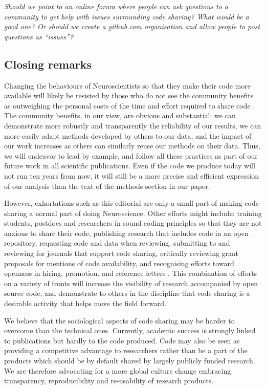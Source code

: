 \documentclass[11pt]{article}
\begin{document}
\textit{Should we point to an online forum where people can ask
  questions to a community to get help with issues surrounding code
  sharing?  What would be a good one?  Or should we create a
  github.com organisation and allow people to post questions as
  ``issues''?}


\subsection*{Closing remarks}

Changing the behaviours of Neuroscientists so that they make their code more available 
will likely be resisted by those who do not see the community benefits as outweighing 
the personal costs of the time and effort required to share code \cite{stodden2010scientific}. 
The community benefits, in our view, are obvious and substantial: we can demonstrate 
more robustly and transparently the reliability of our results, we can more easily adapt
 methods developed by others to our data, and the impact of our work increases as others 
 can similarly reuse our methods on their data. Thus, we will endeavor to lead 
 by example, and follow all these practices as part of our future work in all scientific publications. 
 Even if the code we produce today will not run ten years from now, it will still be a more precise 
 and efficient expression of our analysis than the text of the methods section in our paper. 

However, exhortations such as this editorial are only a small part of making 
code sharing a normal part of doing Neuroscience. Other efforts might include: training  
students,  postdocs and researchers in sound coding principles so that they are not anxious to share their code, 
publishing research that includes code in an open repository, requesting code and data when reviewing, 
submitting to and reviewing for journals that support code sharing, critically reviewing  grant proposals
 for mentions of code availability, and recognising efforts toward openness in hiring, promotion, 
 and reference letters \cite{leveque2012reproducible}. This combination of efforts on a variety of fronts 
 will increase the visibility of research accompanied by open source code, and demonstrate to 
 others in the discipline that code sharing is a desirable activity that helps move the field forward. 

We believe that the sociological aspects of code sharing may be harder to overcome than the technical ones.
Currently, academic success is strongly linked to publications but hardly to the code produced. Code may also be seen as providing a competitive advantage to researchers rather than be a part of the products which should be by default shared by largely publicly funded research. We are therefore advocating for a more global culture change embracing transparency, reproducibility and re-usability of research products.   
\end{document}
